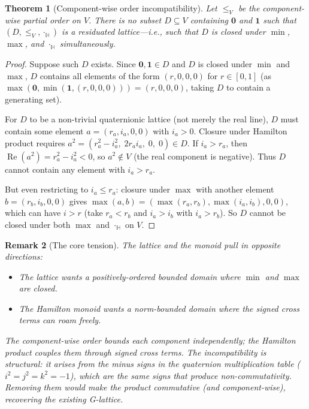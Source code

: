 \documentclass[11pt,a4paper]{article}
\newtheorem{theorem}{Theorem}
\newtheorem{remark}[theorem]{Remark}
\newcommand{\Real}{\operatorname{Re}}
\newcommand{\Hq}{\mathbb{H}}
\begin{document}
\begin{theorem}[Component-wise order incompatibility]
\label{thm:order-incompatibility}
Let $\leq_V$ be the component-wise partial order on $V$. There is no
subset $D \subseteq V$ containing $\mathbf{0}$ and $\mathbf{1}$ such
that $(D, \leq_V, \cdot_{\Hq})$ is a residuated lattice---i.e., such
that $D$ is closed under $\min$, $\max$, and $\cdot_{\Hq}$
simultaneously.
\end{theorem}

\begin{proof}
Suppose such $D$ exists. Since $\mathbf{0}, \mathbf{1} \in D$ and $D$
is closed under $\min$ and $\max$, $D$ contains all elements of the
form $(r, 0, 0, 0)$ for $r \in [0,1]$ (as $\max(\mathbf{0},
\min(\mathbf{1}, (r, 0, 0, 0))) = (r, 0, 0, 0)$, taking
$D$ to contain a generating set).

For $D$ to be a non-trivial quaternionic lattice (not merely the real
line), $D$ must contain some element $a = (r_a, i_a, 0, 0)$ with
$i_a > 0$. Closure under Hamilton product requires
$a^2 = (r_a^2 - i_a^2, \; 2 r_a i_a, \; 0, \; 0) \in D$. If
$i_a > r_a$, then $\Real(a^2) = r_a^2 - i_a^2 < 0$, so
$a^2 \notin V$ (the real component is negative). Thus $D$ cannot
contain any element with $i_a > r_a$.

But even restricting to $i_a \leq r_a$: closure under $\max$ with
another element $b = (r_b, i_b, 0, 0)$ gives
$\max(a, b) = (\max(r_a, r_b), \max(i_a, i_b), 0, 0)$, which can
have $i > r$ (take $r_a < r_b$ and $i_a > i_b$ with $i_a > r_b$).
So $D$ cannot be closed under both $\max$ and $\cdot_{\Hq}$ on $V$.
\end{proof}

\begin{remark}[The core tension]
The lattice and the monoid pull in opposite directions:
\begin{itemize}[nosep]
\item The \emph{lattice} wants a positively-ordered bounded domain where
  $\min$ and $\max$ are closed.
\item The \emph{Hamilton monoid} wants a norm-bounded domain where the
  signed cross terms can roam freely.
\end{itemize}
The component-wise order bounds each component independently; the
Hamilton product couples them through signed cross terms. The
incompatibility is structural: it arises from the \emph{minus signs}
in the quaternion multiplication table ($i^2 = j^2 = k^2 = -1$),
which are the same signs that produce non-commutativity. Removing them
would make the product commutative (and component-wise), recovering the
existing G-lattice.
\end{remark}
\end{document}

